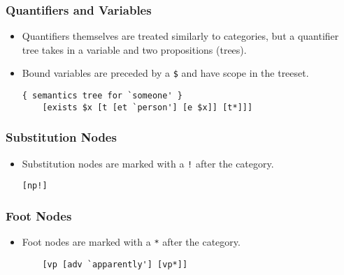 \documentclass[10.5pt]{article}
\newcommand{\code}[1]{\texttt{#1}}
\begin{document}
\subsubsection{Quantifiers and Variables}
  \begin{itemize}
	\item Quantifiers themselves are treated similarly to categories,
	  but a quantifier tree takes in a variable and two propositions (trees).
	\item Bound variables are preceded by a \code{\$} and have scope in the treeset.

	\begin{mdframed}[backgroundcolor=blue!5]
	\begin{verbatim}
{ semantics tree for `someone' }
	[exists $x [t [et `person'] [e $x]] [t*]]]
	\end{verbatim}
	\end{mdframed}
  \end{itemize}

\subsubsection{Substitution Nodes}
  \begin{itemize}
	\item Substitution nodes are marked with a \code{!} after the category.

	\begin{mdframed}[backgroundcolor=blue!5]
	\begin{verbatim}[np!]
	\end{verbatim}
	\end{mdframed}
  \end{itemize}

\subsubsection{Foot Nodes}
  \begin{itemize}
	\item Foot nodes are marked with a \code{*} after the category.

	\begin{mdframed}[backgroundcolor=blue!5]
	\begin{verbatim}
	[vp [adv `apparently'] [vp*]]
	\end{verbatim}
	\end{mdframed}
  \end{itemize}
\end{document}
